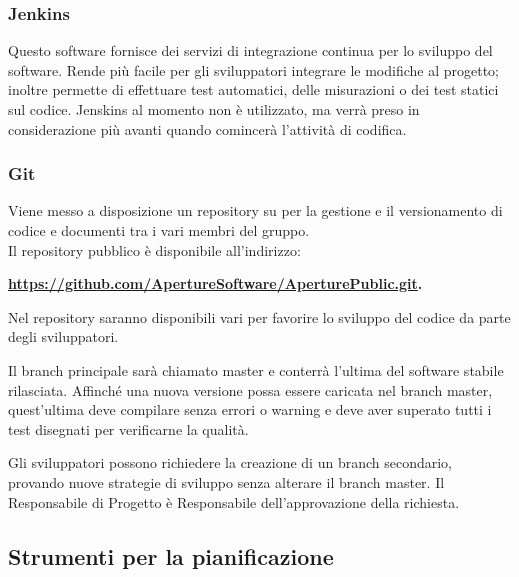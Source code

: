 \subsubsection{Jenkins}
\label{}
Questo software fornisce dei servizi di integrazione continua per lo sviluppo del software. Rende più facile per gli sviluppatori integrare le modifiche al progetto; inoltre permette di effettuare test automatici, delle misurazioni o dei test statici sul codice. Jenskins al momento non è utilizzato, ma verrà preso in considerazione più avanti quando comincerà l'attività di codifica.


\subsubsection{Git}
\label{4.3}
Viene messo a disposizione un repository  su  per la gestione e il versionamento di codice e documenti tra i vari membri del gruppo.\\
Il repository pubblico è disponibile all'indirizzo: \\
\begin{center}
\textbf{\url{https://github.com/ApertureSoftware/AperturePublic.git}.}
\end{center}

\label{4.4}
Nel repository saranno disponibili vari  per favorire lo sviluppo del codice da parte degli sviluppatori.

\label{4.4.1}
Il branch principale sarà chiamato master e conterrà l'ultima  del software stabile rilasciata. Affinché una nuova versione possa essere caricata nel branch master, quest'ultima deve compilare senza errori o warning e deve aver superato tutti i test disegnati per verificarne la qualità.

\label{4.4.2}
Gli sviluppatori possono richiedere la creazione di un branch secondario, provando nuove strategie di sviluppo senza alterare il branch master. Il Responsabile di Progetto è Responsabile dell'approvazione della richiesta.

\subsection{Strumenti per la pianificazione}
\label{}
